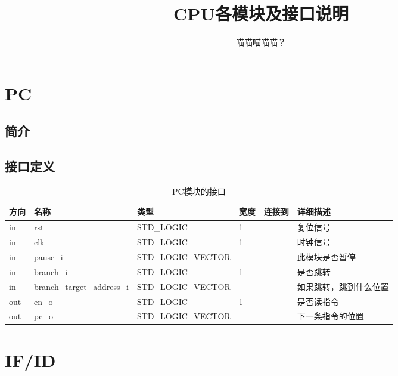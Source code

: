 \documentclass{article}
\title{CPU各模块及接口说明}
\author{喵喵喵喵喵？}
\begin{document}
\maketitle

\tableofcontents
\newpage

\section{PC}
\label{sec:PC}

\subsection{简介}

\FloatBarrier
\subsection{接口定义}

\begin{table}
    \centering
    \small
    \begin{tabular}{lllllp{1.5cm}}
    \toprule
    方向 & 名称 & 类型 & 宽度 & 连接到 & 详细描述 \\ \midrule
    in & rst\label{PC:rst} & STD_LOGIC & 1 & \nameref{sec:MIPS_CPU} & 复位信号 \\
    in & clk\label{PC:clk} & STD_LOGIC & 1 & \nameref{sec:MIPS_CPU} & 时钟信号 \\
    in & pause_i\label{PC:pause_i} & STD_LOGIC_VECTOR & \nameref{const:CTRL_PAUSE_LEN} & \nameref{sec:PAUSE_CTRL} & 此模块是否暂停 \\
    in & branch_i\label{PC:branch_i} & STD_LOGIC & 1 & \nameref{sec:ID} & 是否跳转 \\
    in & branch_target_address_i\label{PC:branch_target_address_i} & STD_LOGIC_VECTOR  & \nameref{const:INST_ADDR_LEN}  & \nameref{sec:ID} & 如果跳转，跳到什么位置    \\
    out & en_o\label{PC:en_o} & STD_LOGIC & 1 & \nameref{sec:MIPS_CPU} & 是否读指令 \\
    out & pc_o\label{PC:pc_o} & STD_LOGIC_VECTOR & \nameref{const:INST_ADDR_LEN}  & \nameref{sec:MIPS_CPU} & 下一条指令的位置 \\
    \bottomrule
    \end{tabular}
    \caption {PC模块的接口}
\end{table}
\FloatBarrier

\section{IF/ID}
\label{sec:IF/ID}
\end{document}
